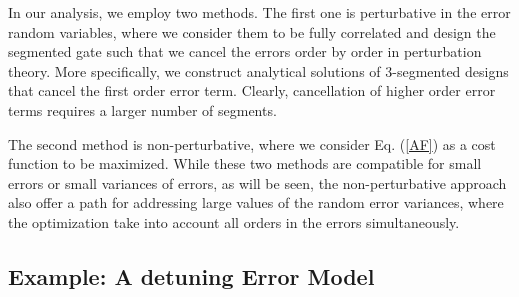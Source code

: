 \documentclass[floatfix,reprint, amsmath,amssymb,aps,superscriptaddress,nofootinbib]{revtex4-2}
\DeclareMathOperator{\Tr}{Tr}
\begin{document}
In our analysis, we employ two methods. The first one is perturbative in the error random variables, where we consider
them to be fully correlated and design the segmented gate such that we cancel the errors
order by order in perturbation theory. More specifically, we construct analytical solutions
of 3-segmented
designs that cancel the first order error term. Clearly, cancellation of higher order error terms requires
a larger number of segments.

The second method is non-perturbative, where we consider Eq. (\ref{AF})
as a cost function to be maximized. 
While these two methods are compatible for small errors or small variances of errors, as will be seen, the non-perturbative approach also offer a path for addressing large values of the random error variances, where the optimization take into account all orders in the errors simultaneously.


 
\subsection{Example: A detuning Error Model \label{sec: detuning error model}}
\end{document}
